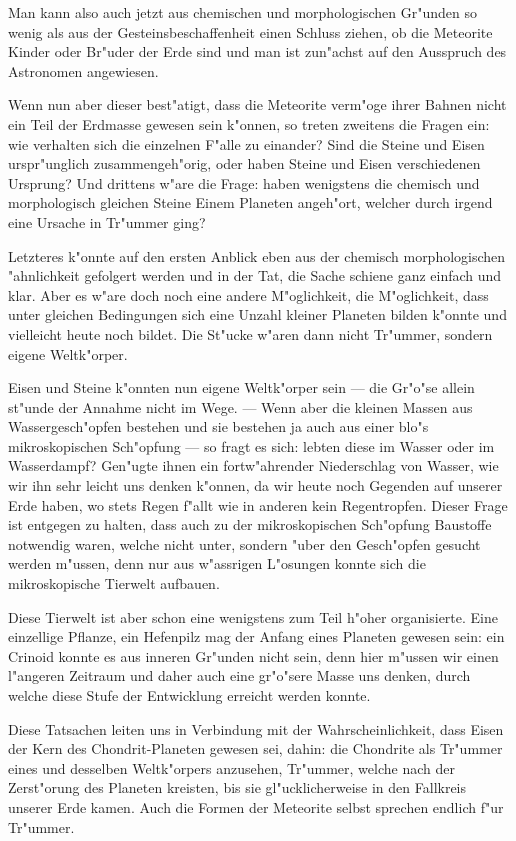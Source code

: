 \documentclass[a4paper, 11pt, oneside]{article}
\begin{document}
Man kann also auch jetzt aus chemischen und morphologischen Gr"unden so wenig als aus der Gesteinsbeschaffenheit einen Schluss ziehen, ob die Meteorite Kinder oder Br"uder der Erde sind und man ist zun"achst auf den Ausspruch des Astronomen angewiesen.

Wenn nun aber dieser best"atigt, dass die Meteorite verm"oge ihrer Bahnen nicht ein Teil der Erdmasse gewesen sein k"onnen, so treten zweitens die Fragen ein: wie verhalten sich die einzelnen F"alle zu einander? Sind die Steine und Eisen urspr"unglich zusammengeh"orig, oder haben Steine und Eisen verschiedenen Ursprung? Und drittens w"are die Frage: haben wenigstens die chemisch und morphologisch gleichen Steine Einem Planeten angeh"ort, welcher durch irgend eine Ursache in Tr"ummer ging?

Letzteres k"onnte auf den ersten Anblick eben aus der chemisch morphologischen "ahnlichkeit gefolgert werden und in der Tat, die Sache schiene ganz einfach und klar. Aber es w"are doch noch eine andere M"oglichkeit, die M"oglichkeit, dass unter gleichen Bedingungen sich eine Unzahl kleiner Planeten bilden k"onnte und vielleicht heute noch bildet. Die St"ucke w"aren dann nicht Tr"ummer, sondern eigene Weltk"orper.

Eisen und Steine k"onnten nun eigene Weltk"orper sein --- die Gr"o"se allein st"unde der Annahme nicht im Wege. --- Wenn aber die kleinen Massen aus Wassergesch"opfen bestehen und sie bestehen ja auch aus einer blo"s mikroskopischen Sch"opfung --- so fragt es sich: lebten diese im Wasser oder im Wasserdampf? Gen"ugte ihnen ein fortw"ahrender Niederschlag von Wasser, wie wir ihn sehr leicht uns denken k"onnen, da wir heute noch Gegenden auf unserer Erde haben, wo stets Regen f"allt wie in anderen kein Regentropfen. Dieser Frage ist entgegen zu halten, dass auch zu der mikroskopischen Sch"opfung Baustoffe notwendig waren, welche nicht unter, sondern "uber den Gesch"opfen gesucht werden m"ussen, denn nur aus w"assrigen L"osungen konnte sich die mikroskopische Tierwelt aufbauen.

Diese Tierwelt ist aber schon eine wenigstens zum Teil h"oher organisierte. Eine einzellige Pflanze, ein Hefenpilz mag der Anfang eines Planeten gewesen sein: ein Crinoid konnte es aus inneren Gr"unden nicht sein, denn hier m"ussen wir einen l"angeren Zeitraum und daher auch eine gr"o"sere Masse uns denken, durch welche diese Stufe der Entwicklung erreicht werden konnte.

Diese Tatsachen leiten uns in Verbindung mit der Wahrscheinlichkeit, dass Eisen der Kern des Chondrit-Planeten gewesen sei, dahin: die Chondrite als Tr"ummer eines und desselben Weltk"orpers anzusehen, Tr"ummer, welche nach der Zerst"orung des Planeten kreisten, bis sie gl"ucklicherweise in den Fallkreis unserer Erde kamen. Auch die Formen der Meteorite selbst sprechen endlich f"ur Tr"ummer.
\end{document}
